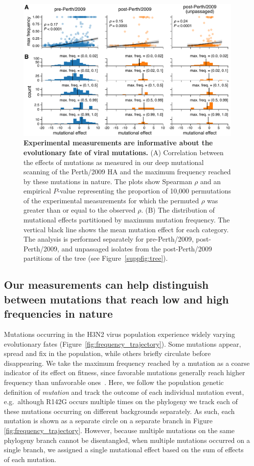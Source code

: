 \documentclass[9pt,twocolumn,twoside]{pnas-new}
\begin{document}
\begin{figure}
\centering
\includegraphics[width=12cm]{figs/muteffect_by_maxfreq/muteffect_by_maxfreq.pdf}
\caption{\label{fig:muteffect_maxfreq}
{\bf Experimental measurements are informative about the evolutionary fate of viral mutations.}
(A) Correlation between the effects of mutations as measured in our deep mutational scanning of the Perth/2009 HA and the maximum frequency reached by these mutations in nature.
The plots show Spearman $\rho$ and an empirical $P$-value representing the proportion of 10,000 permutations of the experimental measurements for which the permuted $\rho$ was greater than or equal to the observed $\rho$.
(B) The distribution of mutational effects partitioned by maximum mutation frequency.
The vertical black line shows the mean mutation effect for each category.
The analysis is performed separately for pre-Perth/2009, post-Perth/2009, and unpassaged isolates from the post-Perth/2009 partitions of the tree (see Figure~\ref{suppfig:tree}).
}
\end{figure}

\subsection*{Our measurements can help distinguish between mutations that reach low and high frequencies in nature}
Mutations occurring in the H3N2 virus population experience widely varying evolutionary fates (Figure~\ref{fig:frequency_trajectory}).
Some mutations appear, spread and fix in the population, while others briefly circulate before disappearing.
We take the maximum frequency reached by a mutation as a coarse indicator of its effect on fitness, since favorable mutations generally reach higher frequency than unfavorable ones~\cite{ewens2012mathematical}.
Here, we follow the population genetic definition of \textit{mutation} and track the outcome of each individual mutation event, e.g.\ although R142G occurs multiple times on the phylogeny we track each of these mutations occurring on different backgrounds separately.
As such, each mutation is shown as a separate circle on a separate branch in Figure \ref{fig:frequency_trajectory}.
However, because multiple mutations on the same phylogeny branch cannot be disentangled, when multiple mutations occurred on a single branch, we assigned a single mutational effect based on the sum of effects of each mutation.
\end{document}
